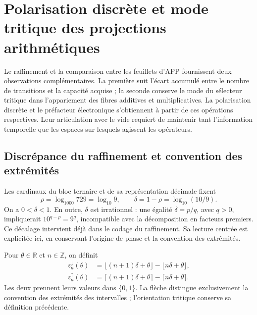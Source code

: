 \section{Polarisation discrète et mode tritique des projections arithmétiques}
\label{iii:sec:vacancias-prefactor}

Le raffinement et la comparaison entre les feuillets d’APP fournissent deux
observations complémentaires. La première suit l’écart accumulé
entre le nombre de transitions et la capacité acquise ; la seconde conserve
le mode du sélecteur tritique dans l’appariement des fibres additives et
multiplicatives. La polarisation discrète et le préfacteur électronique
s’obtiennent à partir de ces opérations respectives. Leur articulation avec le vide
requiert de maintenir tant l’information temporelle que les espaces sur
lesquels agissent les opérateurs.

\subsection{Discrépance du raffinement et convention des extrémités}

Les cardinaux du bloc ternaire et de sa représentation décimale fixent
\[
 \rho=\log_{1000}729=\log_{10}9,\qquad
 \delta=1-\rho=\log_{10}(10/9).
\]
On a $0<\delta<1$. En outre, $\delta$ est irrationnel : une égalité $\delta=p/q$, avec $q>0$, impliquerait $10^{q-p}=9^q$, incompatible avec la décomposition en facteurs premiers. Ce décalage intervient déjà dans le codage du raffinement. Sa lecture centrée est explicitée ici, en conservant l'origine de phase et la convention des extrémités.

\begin{definition}
Pour $\theta\in\mathbb R$ et $n\in\mathbb Z$, on définit
\begin{align}
 z_n^{\downarrow}(\theta)
 &=\lfloor(n+1)\delta+\theta\rfloor-\lfloor n\delta+\theta\rfloor,
 \label{iii:vp:lower}\\
 z_n^{\uparrow}(\theta)
 &=\lceil(n+1)\delta+\theta\rceil-\lceil n\delta+\theta\rceil.
 \label{iii:vp:upper}
\end{align}
Les deux prennent leurs valeurs dans $\{0,1\}$. La flèche distingue exclusivement la convention des extrémités des intervalles ; l'orientation tritique conserve sa définition précédente.
\end{definition}

